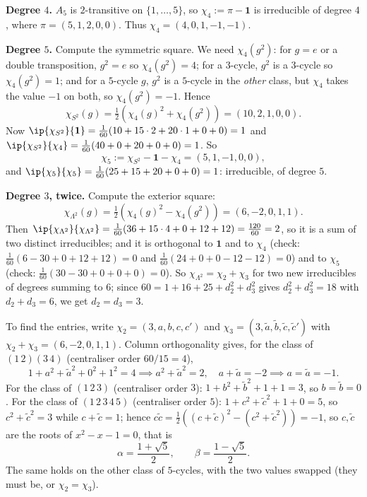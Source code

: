 \textbf{Degree $4$.} $A_5$ is $2$-transitive on $\{1,\dots,5\}$, so $\chi_4 := \pi - \mathbf 1$ is irreducible of degree $4$, where $\pi = (5,1,2,0,0)$. Thus $\chi_4 = (4,0,1,-1,-1)$.

\textbf{Degree $5$.} Compute the symmetric square. We need $\chi_4(g^2)$: for $g = e$ or a double transposition, $g^2 = e$ so $\chi_4(g^2) = 4$; for a $3$-cycle, $g^2$ is a $3$-cycle so $\chi_4(g^2) = 1$; and for a $5$-cycle $g$, $g^2$ is a $5$-cycle in the \emph{other} class, but $\chi_4$ takes the value $-1$ on both, so $\chi_4(g^2) = -1$. Hence
$$\chi_{S^2}(g) = \tfrac12(\chi_4(g)^2 + \chi_4(g^2)) = (10, 2, 1, 0, 0).$$
Now $\ip{\chi_{S^2}}{\mathbf 1} = \frac1{60}(10 + 15\cdot2 + 20\cdot 1 + 0 + 0) = 1$ and $\ip{\chi_{S^2}}{\chi_4} = \frac1{60}(40 + 0 + 20 + 0 + 0) = 1$. So
$$\chi_5 := \chi_{S^2} - \mathbf 1 - \chi_4 = (5,1,-1,0,0),$$
and $\ip{\chi_5}{\chi_5} = \frac1{60}(25 + 15 + 20 + 0 + 0) = 1$: irreducible, of degree $5$.

\textbf{Degree $3$, twice.} Compute the exterior square:
$$\chi_{\Lambda^2}(g) = \tfrac12(\chi_4(g)^2 - \chi_4(g^2)) = (6,-2,0,1,1).$$
Then $\ip{\chi_{\Lambda^2}}{\chi_{\Lambda^2}} = \frac1{60}(36 + 15\cdot 4 + 0 + 12 + 12) = \frac{120}{60} = 2$, so it is a sum of two distinct irreducibles; and it is orthogonal to $\mathbf 1$ and to $\chi_4$ (check: $\frac1{60}(6 - 30 + 0 + 12+12) = 0$ and $\frac1{60}(24 + 0 + 0 - 12 - 12) = 0$) and to $\chi_5$ (check: $\frac1{60}(30 - 30 + 0 + 0 + 0) = 0$). So $\chi_{\Lambda^2} = \chi_2 + \chi_3$ for two new irreducibles of degrees summing to $6$; since $60 = 1 + 16+25+d_2^2+d_3^2$ gives $d_2^2+d_3^2 = 18$ with $d_2+d_3 = 6$, we get $d_2 = d_3 = 3$.

To find the entries, write $\chi_2 = (3,a,b,c,c')$ and $\chi_3 = (3,\tilde a,\tilde b,\tilde c,\tilde c')$ with $\chi_2+\chi_3 = (6,-2,0,1,1)$. Column orthogonality gives, for the class of $(1\,2)(3\,4)$ (centraliser order $60/15 = 4$),
$$1 + a^2+\tilde a^2 + 0^2 + 1^2 = 4 \implies a^2 + \tilde a^2 = 2, \quad a + \tilde a = -2 \implies a = \tilde a = -1.$$
For the class of $(1\,2\,3)$ (centraliser order $3$): $1 + b^2+\tilde b^2 + 1 + 1 = 3$, so $b = \tilde b = 0$. For the class of $(1\,2\,3\,4\,5)$ (centraliser order $5$): $1 + c^2 + \tilde c^2 + 1 + 0 = 5$, so $c^2+\tilde c^2 = 3$ while $c + \tilde c = 1$; hence $c\tilde c = \frac12((c+\tilde c)^2 - (c^2+\tilde c^2)) = -1$, so $c,\tilde c$ are the roots of $x^2 - x - 1 = 0$, that is
$$\alpha = \frac{1+\sqrt5}{2}, \qquad \beta = \frac{1-\sqrt5}{2}.$$
The same holds on the other class of $5$-cycles, with the two values swapped (they must be, or $\chi_2 = \chi_3$).

